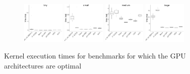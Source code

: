 \documentclass[../document.tex]{subfiles}
\begin{document}
\begin{figure}
	\begin{subfigure}{0.09\textwidth} \label{fig:time-srad} \vspace{5mm}\end{subfigure}
	\begin{subfigure}{0.9\textwidth}
		\includegraphics[width=0.22\textwidth]{figures/time-results/generate_srad_tiny_boxplot-1}
		\includegraphics[width=0.22\textwidth]{figures/time-results/generate_srad_small_boxplot-1}
		\includegraphics[width=0.22\textwidth]{figures/time-results/generate_srad_medium_boxplot-1}
		\includegraphics[width=0.22\textwidth]{figures/time-results/generate_srad_large_boxplot-1}
	\end{subfigure}
    \caption{Kernel execution times for benchmarks for which the GPU architectures are optimal}\label{fig:time}
\end{figure}


\end{document}
